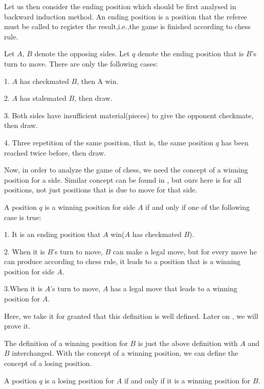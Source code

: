 Let us then consider the ending position which should be first analysed in backward induction method. An ending position is a position that the referee must be called to register the result,i.e.,the game is finished according to chess rule.

 Let $A$, $B$ denote the opposing sides. Let $q$ denote the ending position that is $B$'s turn to move. There are only the following cases:

1. $A$ has checkmated $B$, then A win.

2. $A$ has stalemated $B$, then draw.

3. Both sides have insufficient material(pieces) to give the opponent checkmate, then draw.

4. Three repetition of the same position, that is, the same position $q$ has been reached twice before, then draw.

Now, in order to analyze the game of chess, we need the concept of a winning position for a side. Similar concept can be found in \parencite{walker2001}, but ours here is for all positions, 
not just positions that is due to move for that side.

\begin{definition} 


A position $q$ is a winning position for side $A$ if and only if one of the
following case is true:

1. It is an ending position that $A$ win($A$ has checkmated $B$).

2. When it is $B$'s turn to move, $B$ can make a legal move, but for
every move he can produce according to chess rule, it leads to a position that
is a winning position for side $A$.

 3.When it is $A$'s turn to move, $A$ has a legal
move that leads to a winning position for $A$.

\end{definition}

Here, we take it for granted that this definition is well
defined. Later on , we will prove it.

The definition of a winning position for $B$ is just the above definition with $A$ and $B$ interchanged.
With the concept of a winning position, we can define the concept of a losing
position.

\begin{definition}
A position $q$ is a losing position for $A$ if and only if it is a winning position for $B$.
\end{definition}

